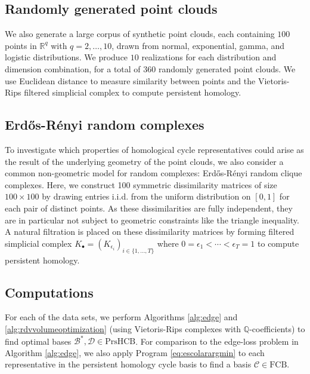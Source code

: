 \documentclass[11pt,onecolumn]{article}
\newcommand{\Q}{\mathbb{Q}}
\newcommand{\fcyclebasis}{\mathcal{C}}
\newcommand{\setoffilteredcyclebases}{\mathrm{FCB}}
\newcommand{\setofpersistenthcyclebases}{\mathrm{PrsHCB}}
\newcommand{\pr}{Program }
\renewcommand{\arraystretch}{1.5}
\newcommand{\hcyclebasis}{\mathcal B}
\newcommand{\deathbasis}{\mathcal D}
\theoremstyle{plain}
\theoremstyle{definition}
\begin{document}
\setlength{\tabcolsep}{10pt}

\renewcommand{\arraystretch}{1.5}



\subsection{Randomly generated point clouds}\label{sec: randompointclouds}
We also generate a large corpus of synthetic point clouds, each containing $100$ points in $\mathbb{R}^q$ with $q = 2,\ldots,10$, drawn from normal, exponential, gamma, and logistic distributions. We produce $10$ realizations for each distribution and dimension combination, for a total of $360$ randomly generated point clouds. We use Euclidean distance to measure similarity between points and the Vietoris- Rips filtered simplicial complex to compute persistent homology. 

\subsection{Erd\H{o}s-R\'enyi random complexes}\label{sec:erdos}

To investigate which properties of homological cycle representatives could arise as the result of the underlying geometry of the point clouds, we also consider a common non-geometric model for random complexes: Erd\H{o}s-R\'enyi random clique complexes. Here, we construct 100  symmetric dissimilarity matrices of size $100 \times 100$ by drawing entries i.i.d. from the uniform distribution on $[0,1]$ for each pair of distinct points. As these dissimilarities are fully independent, they are in particular not subject to geometric constraints like the triangle inequality. A natural filtration is placed on these dissimilarity matrices by forming filtered simplicial complex $K_\bullet = (K_{\epsilon_i})_{i \in\{ 1, \ldots, T\}}$ where $0=\epsilon_1 < \cdots < \epsilon_T=1$ to compute persistent homology.

\subsection{Computations}

For each of the data sets, we perform Algorithms \ref{alg:edge} and \ref{alg:rdvvolumeoptimization} (using Vietoris-Rips complexes with $\Q$-coefficients) to find optimal bases $\hcyclebasis^*, \deathbasis \in \setofpersistenthcyclebases$.  For comparison to the edge-loss problem in Algorithm \ref{alg:edge}, we also apply \pr \eqref{eq:escolarargmin} to each representative in the persistent homology cycle basis to find a basis $\fcyclebasis \in \setoffilteredcyclebases$.
\end{document}
